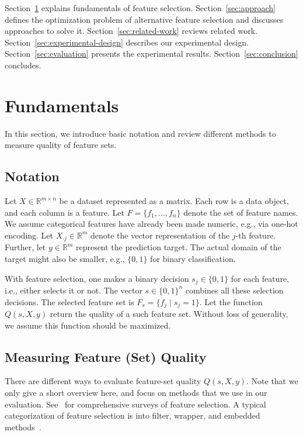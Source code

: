 \documentclass[conference]{IEEEtran}
\theoremstyle{definition}
\begin{document}
Section~\ref{sec:fundamentals} explains fundamentals of feature selection.
Section~\ref{sec:approach} defines the optimization problem of alternative feature selection and discusses approaches to solve it.
Section~\ref{sec:related-work} reviews related work.
Section~\ref{sec:experimental-design} describes our experimental design.
Section~\ref{sec:evaluation} presents the experimental results.
Section~\ref{sec:conclusion} concludes.

\section{Fundamentals}
\label{sec:fundamentals}

In this section, we introduce basic notation and review different methods to measure quality of feature sets.

\subsection{Notation}
\label{sec:fundamentals:notation}

Let $X \in \mathbb{R}^{m \times n}$ be a dataset represented as a matrix.
Each row is a data object, and each column is a feature.
Let $F = \{f_1, \dots, f_n\}$ denote the set of feature names.
We assume categorical features have already been made numeric, e.g., via one-hot encoding.
Let $X_{\cdot{}j} \in \mathbb{R}^m$ denote the vector representation of the $j$-th feature.
Further, let $y \in \mathbb{R}^m$ represent the prediction target.
The actual domain of the target might also be smaller, e.g., $\{0,1\}$ for binary classification.

With feature selection, one makes a binary decision $s_j \in \{0,1\}$ for each feature, i.e., either selects it or not.
The vector $s \in \{0,1\}^n$ combines all these selection decisions.
The selected feature set is $F_s = \{f_j \mid s_j=1\}$.
Let the function $Q(s,X,y)$ return the quality of a such feature set.
Without loss of generality, we assume this function should be maximized.

\subsection{Measuring Feature (Set) Quality}
\label{sec:fundamentals:quality}

There are different ways to evaluate feature-set quality $Q(s,X,y)$.
Note that we only give a short overview here, and focus on methods that we use in our evaluation.
See~\cite{chandrashekar2014survey,li2017feature} for comprehensive surveys of feature selection.
A typical categorization of feature selection is into filter, wrapper, and embedded methods~\cite{guyon2003introduction}.
\end{document}
